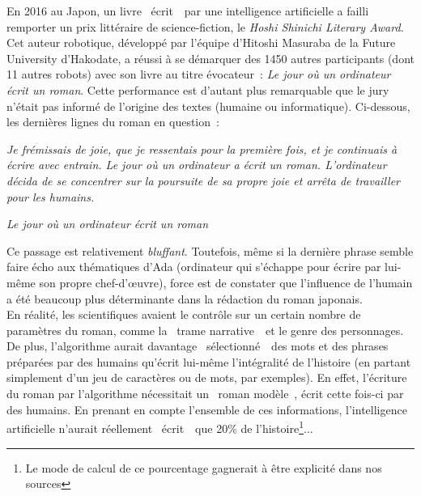 \documentclass{article}
\newenvironment{citationbox}
{\begin{center}
		\begin{minipage}{.8\textwidth}
		}
		{
		\end{minipage}	
\end{center}
}
\begin{document}
					En 2016 au Japon, un livre \guillemotleft~écrit~\guillemotright~par une intelligence artificielle a failli remporter un prix littéraire de science-fiction, le \textit{Hoshi Shinichi Literary Award}. Cet auteur robotique, développé par l'équipe d'Hitoshi Masuraba de la Future University d'Hakodate, a réussi à se démarquer des 1450 autres participants (dont 11 autres robots) avec son livre au titre évocateur~: \textit{Le jour où un ordinateur écrit un roman}. Cette performance est d'autant plus remarquable que le jury n'était pas informé de l'origine des textes (humaine ou informatique). Ci-dessous, les dernières lignes du roman en question~:
					\begin{citationbox}
						\textit{Je frémissais de joie, que je ressentais pour la première fois, et je continuais à écrire avec entrain. Le jour où un ordinateur a écrit un roman. L'ordinateur décida de se concentrer sur la poursuite de sa propre joie et arrêta de travailler pour les humains.}
						\begin{flushright}
							\textit{Le jour où un ordinateur écrit un roman}
						\end{flushright}
					\end{citationbox}
					Ce passage est relativement \textit{bluffant}. Toutefois, même si la dernière phrase semble faire écho aux thématiques d'Ada (ordinateur qui s'échappe pour écrire par lui-même son propre chef-d'œuvre), force est de constater que l'influence de l'humain a été beaucoup plus déterminante dans la rédaction du roman japonais.\\
					En réalité, les scientifiques avaient le contrôle sur un certain nombre de paramètres du roman, comme la \guillemotleft~trame narrative~\guillemotright~et le genre des personnages. De plus, l'algorithme aurait davantage \guillemotleft~sélectionné~\guillemotright~des mots et des phrases préparées par des humains qu'écrit lui-même l'intégralité de l'histoire (en partant simplement d'un jeu de caractères ou de mots, par exemples). En effet, l'écriture du roman par l'algorithme nécessitait un \guillemotleft~roman modèle~\guillemotright, écrit cette fois-ci par des humains. En prenant en compte l'ensemble de ces informations, l'intelligence artificielle n'aurait réellement \guillemotleft~écrit~\guillemotright~que 20\% de l'histoire\footnote{Le mode de calcul de ce pourcentage gagnerait à être explicité dans nos sources}...\\
					
\end{document}
